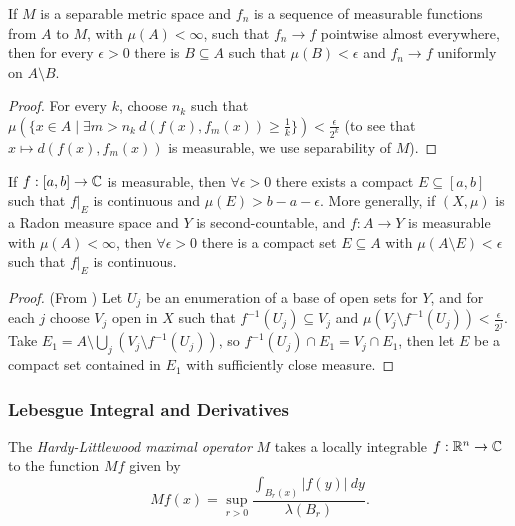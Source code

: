 \documentclass[letterpaper,11pt]{report}
\begin{document}

\begin{thm} If $M$ is a separable metric space and $f_n$ is a sequence of measurable functions from $A$ to $M$, with $\mu(A) < \infty$, such that $f_n \rightarrow f$ pointwise almost everywhere, then for every $\epsilon > 0$ there is $B \subseteq A$ such that $\mu(B) < \epsilon$ and $f_n \rightarrow f$ uniformly on $A\setminus B$.
\end{thm}
\begin{proof} For every $k$, choose $n_k$ such that $\mu(\{x \in A \mid \exists m > n_k\ d(f(x),f_m(x)) \ge \frac{1}{k}\}) < \frac{\epsilon}{2^k}$ (to see that $x \mapsto d(f(x),f_m(x))$ is measurable, we use separability of $M$).
\end{proof}

\begin{thm}\label{lusin} If $f : [a,b] \rightarrow \mathbb{C}$ is measurable, then $\forall \epsilon > 0$ there exists a compact $E \subseteq [a,b]$ such that $f|_E$ is continuous and $\mu(E) > b-a-\epsilon$. More generally, if $(X,\mu)$ is a Radon measure space and $Y$ is second-countable, and $f : A \rightarrow Y$ is measurable with $\mu(A) < \infty$, then $\forall \epsilon > 0$ there is a compact set $E \subseteq A$ with $\mu(A\setminus E) < \epsilon$ such that $f|_E$ is continuous.
\end{thm}
\begin{proof} (From \cite{feldman-lusin}) Let $U_j$ be an enumeration of a base of open sets for $Y$, and for each $j$ choose $V_j$ open in $X$ such that $f^{-1}(U_j) \subseteq V_j$ and $\mu(V_j \setminus f^{-1}(U_j)) < \frac{\epsilon}{2^j}$. Take $E_1 = A\setminus \bigcup_j (V_j \setminus f^{-1}(U_j))$, so $f^{-1}(U_j) \cap E_1 = V_j\cap E_1$, then let $E$ be a compact set contained in $E_1$ with sufficiently close measure.
\end{proof}


\subsubsection{Lebesgue Integral and Derivatives}

\begin{defn} The \emph{Hardy-Littlewood maximal operator} $M$ takes a locally integrable $f : \mathbb{R}^n \rightarrow \mathbb{C}$ to the function $Mf$ given by
\[
Mf(x) = \sup_{r > 0} \frac{\int_{B_r(x)} |f(y)|\ dy}{\lambda(B_r)}.
\]
\end{defn}
\end{document}
